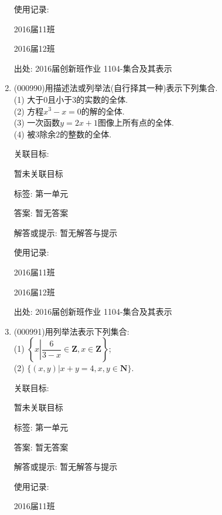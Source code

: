\documentclass[10pt,a4paper]{article}
\begin{document}
\begin{enumerate}[1.]
使用记录:

2016届11班			

2016届12班			


出处: 2016届创新班作业	1104-集合及其表示
\item { (000990)}用描述法或列举法(自行择其一种)表示下列集合.\\ 
(1) 大于$0$且小于$3$的实数的全体.\\ 
(2) 方程$x^3-x=0$的解的全体.\\ 
(3) 一次函数$y=2x+1$图像上所有点的全体.\\ 
(4) 被$3$除余$2$的整数的全体.


关联目标:

暂未关联目标



标签: 第一单元

答案: 暂无答案

解答或提示: 暂无解答与提示

使用记录:

2016届11班				

2016届12班				


出处: 2016届创新班作业	1104-集合及其表示
\item { (000991)}用列举法表示下列集合:\\ 
(1) $\left\{x\left| \dfrac{6}{3-x}\in\mathbf{Z},x\in\mathbf{Z}\right.\right\}$;\\ 
(2) $\{(x,y)|x+y=4,x,y\in\mathbf{N}\}$.


关联目标:

暂未关联目标



标签: 第一单元

答案: 暂无答案

解答或提示: 暂无解答与提示

使用记录:

2016届11班		


\end{enumerate}
\end{document}
